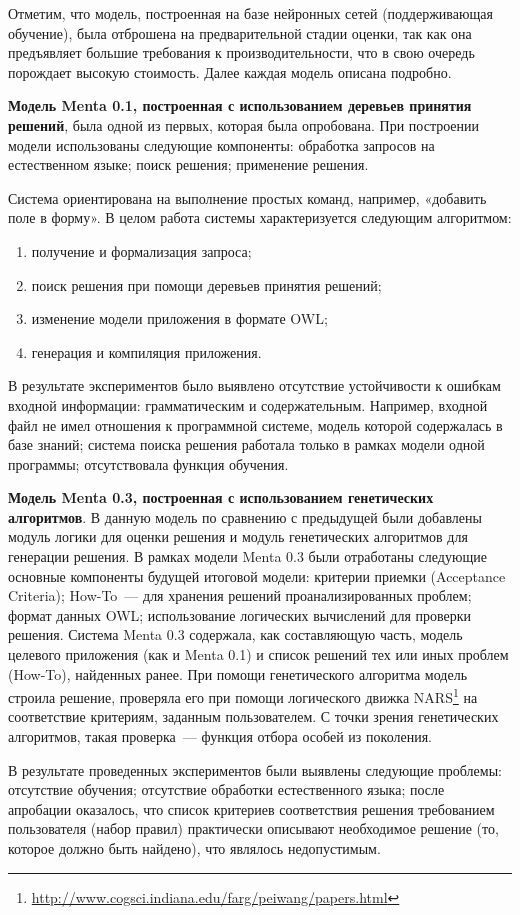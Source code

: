 Отметим, что модель, построенная на базе нейронных сетей (поддерживающая обучение), была отброшена на предварительной стадии оценки, так как она предъявляет большие требования к производительности, что в свою очередь порождает высокую стоимость. Далее каждая модель описана подробно.

\textbf{Модель Menta 0.1, построенная с использованием деревьев принятия решений}, была одной из первых, которая была опробована. При построении модели использованы следующие компоненты: обработка запросов на естественном языке; поиск решения; применение решения. \par
Система ориентирована на выполнение простых команд, например, «добавить поле в форму». В целом работа системы характеризуется следующим алгоритмом:
\begin{enumerate}
	\item получение и формализация запроса;
	\item поиск решения при помощи деревьев принятия решений;
	\item изменение модели приложения в формате OWL;
	\item генерация и компиляция приложения.
\end{enumerate} \par
В результате экспериментов было выявлено отсутствие устойчивости к ошибкам входной информации: грамматическим и содержательным. Например, входной файл не имел отношения к программной системе, модель которой содержалась в базе знаний; система поиска решения работала только в рамках модели одной программы;  отсутствовала функция обучения. \par



\textbf{Модель Menta 0.3, построенная с использованием генетических алгоритмов}.
В данную модель по сравнению с предыдущей были добавлены модуль логики для оценки решения и модуль генетических алгоритмов для генерации решения. В рамках модели Menta 0.3 были отработаны следующие основные компоненты будущей итоговой модели: критерии приемки (Acceptance Criteria); How-To~--- для хранения решений проанализированных проблем; формат данных OWL; использование логических вычислений для проверки решения. Система Menta 0.3 содержала, как составляющую часть, модель целевого приложения (как и Menta 0.1) и список решений тех или иных проблем (How-To), найденных ранее. При помощи генетического алгоритма модель строила решение, проверяла его при помощи логического движка NARS\footnote{\url{http://www.cogsci.indiana.edu/farg/peiwang/papers.html}} на соответствие критериям, заданным пользователем. С точки зрения генетических алгоритмов, такая проверка~--- функция отбора особей из поколения.  \par
В результате проведенных экспериментов были выявлены следующие проблемы: отсутствие обучения; отсутствие обработки естественного языка; после апробации оказалось, что список критериев соответствия решения требованием пользователя (набор правил) практически описывают необходимое решение (то, которое должно быть найдено), что являлось недопустимым. \par


